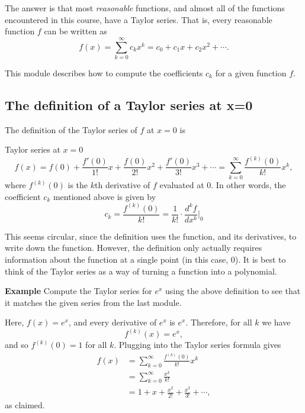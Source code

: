 \documentclass[twoside,openright,titlepage,a4paper]{book}
\begin{document}
\begin{sloppypar}
The answer is that most \textit{reasonable} functions, and almost all of the functions encountered in this course, have a Taylor series. That is, every reasonable function $f$ can be written as \[f(x)=\sum_{k=0}^\infty c_k x^k=c_0+c_1 x+c_2 x^2+\dotsb.\]

This module describes how to compute the coefficients $c_k$ for a given function $f$.

\subsection{The definition of a Taylor series at x=0}
The definition of the Taylor series of $f$ at ${x=0}$ is
\begin{definitionbox}
	Taylor series at ${x=0}$
	\begin{equation*}	
	f(x) = f(0) + \frac{f'(0)}{1!}x + \frac{f(0)}{2!}x^2 + \frac{f'(0)}{3!}x^3+\dotsb = \sum_{k=0}^\infty \frac{f^{\left(k\right)}(0)}{k!} x^k,
	\end{equation*}
	where ${f^{\left(k\right)}(0)}$ is the $k$th derivative of $f$ evaluated at 0. In other words, the coefficient $c_k$ mentioned above is given by \[c_k=\frac{f^{\left(k\right)}(0)}{k!}=\frac{1}{k!}\cdot\frac{d^k f}{dx^k}\bigg|_0\] 
\end{definitionbox}

This seems circular, since the definition uses the function, and its derivatives, to write down the function. However, the definition only actually requires information about the function at a single point (in this case, 0). It is best to think of the Taylor series as a way of turning a function into a polynomial.

\textbf{Example} Compute the Taylor series for $e^x$ using the above definition to see that it matches the given series from the last module.
\begin{examplebox}
Here, ${f(x)=e^x}$, and every derivative of $e^x$ is $e^x$. Therefore, for all $k$ we have \[f^{\left(k\right)}(x)=e^x,\] and so ${f^{\left(k\right)}(0)=1}$ for all $k$. Plugging into the Taylor series formula gives
\begin{align*}
f(x) &= \sum_{k=0}^\infty \frac{f^{\left(k\right)}(0)}{k!} x^k \\
&= \sum_{k=0}^\infty \frac{x^k}{k!} \\
&= 1 + x + \frac{x^2}{2!} + \frac{x^3}{3!} + \dotsb, 
\end{align*}
as claimed.
\end{examplebox}


\end{sloppypar}
\end{document}
